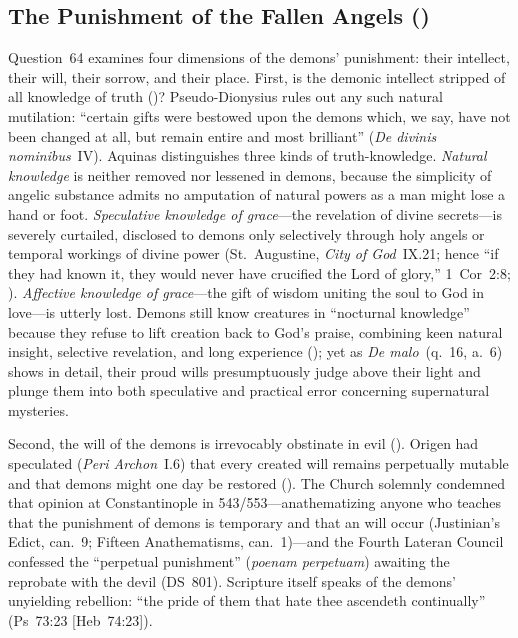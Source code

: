 \subsection{The Punishment of the Fallen Angels ()}

Question~64 examines four dimensions of the demons' punishment: their intellect, their will, their sorrow, and their place. First, is the demonic intellect stripped of all knowledge of truth ()? Pseudo-Dionysius rules out any such natural mutilation: ``certain gifts were bestowed upon the demons which, we say, have not been changed at all, but remain entire and most brilliant'' (\emph{De divinis nominibus}~IV). Aquinas distinguishes three kinds of truth-knowledge. \emph{Natural knowledge} is neither removed nor lessened in demons, because the simplicity of angelic substance admits no amputation of natural powers as a man might lose a hand or foot. \emph{Speculative knowledge of grace}---the revelation of divine secrets---is severely curtailed, disclosed to demons only selectively through holy angels or temporal workings of divine power (St.~Augustine, \emph{City of God}~IX.21; hence ``if they had known it, they would never have crucified the Lord of glory,'' 1~Cor~2:8; ). \emph{Affective knowledge of grace}---the gift of wisdom uniting the soul to God in love---is utterly lost. Demons still know creatures in ``nocturnal knowledge'' because they refuse to lift creation back to God's praise, combining keen natural insight, selective revelation, and long experience (); yet as \emph{De malo}~(q.~16, a.~6) shows in detail, their proud wills presumptuously judge above their light and plunge them into both speculative and practical error concerning supernatural mysteries.

Second, the will of the demons is irrevocably obstinate in evil (). Origen had speculated (\emph{Peri Archon}~I.6) that every created will remains perpetually mutable and that demons might one day be restored (). The Church solemnly condemned that opinion at Constantinople in 543/553---anathematizing anyone who teaches that the punishment of demons is temporary and that an  will occur (Justinian's Edict, can.~9; Fifteen Anathematisms, can.~1)---and the Fourth Lateran Council confessed the ``perpetual punishment'' (\emph{poenam perpetuam}) awaiting the reprobate with the devil (DS~801). Scripture itself speaks of the demons' unyielding rebellion: ``the pride of them that hate thee ascendeth continually'' (Ps~73:23 [Heb~74:23]).

